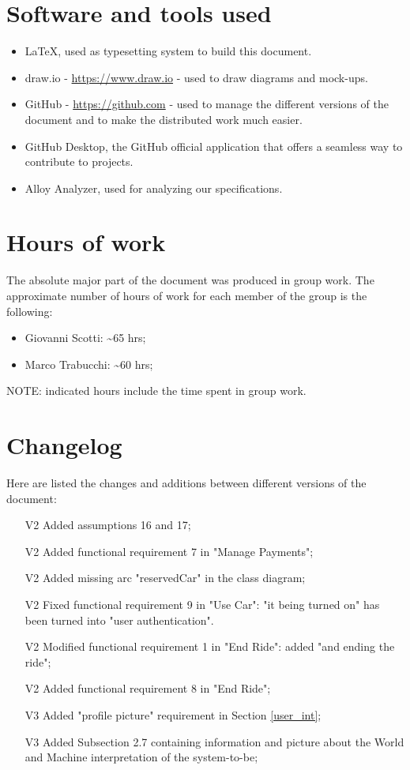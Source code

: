 \section{Software and tools used}
\begin{itemize}
\item \LaTeX, used as typesetting system to build this document.
\item draw.io - \url{https://www.draw.io} - used to draw diagrams and mock-ups.
\item GitHub - \url{https://github.com} - used to manage the different versions of the document and to make the distributed work much easier.
\item GitHub Desktop, the GitHub official application that offers a seamless way to contribute to projects.
\item Alloy Analyzer, used for analyzing our specifications.
\end{itemize}
\section{Hours of work}
The absolute major part of the document was produced in group work. The approximate number of hours of work for each member of the group is the following:

\begin{itemize}
\item Giovanni Scotti: \textasciitilde 65 hrs;
\item Marco Trabucchi: \textasciitilde 60 hrs;
\end{itemize}

NOTE: indicated hours include the time spent in group work.

\section{Changelog}
Here are listed the changes and additions between different versions of the document:
\begin{itemize}
\item[V2] Added assumptions 16 and 17;
\item[V2] Added functional requirement 7 in "Manage Payments";
\item[V2] Added missing arc "reservedCar" in the class diagram;
\item[V2] Fixed functional requirement 9 in "Use Car": "it being turned on" has been turned into "user authentication".
\item[V2] Modified functional requirement 1 in "End Ride": added "and ending the ride";
\item[V2] Added functional requirement 8 in "End Ride";
\item[V3] Added "profile picture" requirement in Section \ref{user_int};
\item[V3] Added Subsection 2.7 containing information and picture about the World and Machine interpretation of the system-to-be;
\end{itemize}
